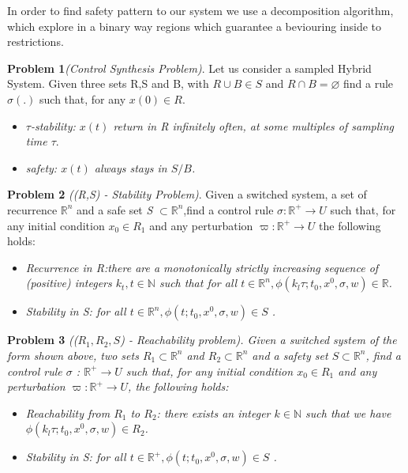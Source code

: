 \documentclass[conference]{IEEEtran}
\begin{document}
In order to find safety pattern to our system we  use a
decomposition algorithm, which explore in a binary way regions which
guarantee a beviouring inside to restrictions. \cite{le2017improved}

  \textbf{Problem 1}\emph{(Control Synthesis Problem)}. Let us 
consider a sampled Hybrid System. Given three sets R,S and B, 
with ${R \cup B \in S}$  and ${R \cap B = \varnothing }$ find a 
rule ${\sigma(.)}$ such that, for any ${x(0) \in R }$. 

\begin{itemize}
    \item \emph{ ${\tau}$-stability: ${x(t)}$ return in R 
    infinitely often, at some multiples of sampling time ${\tau}$}.
    \item \emph{ safety: ${x(t)}$ always stays in ${S/B}$.}
\end{itemize}




 \textbf{Problem 2} \emph{((R,S) - Stability Problem)}. Given a 
 switched system, a set of recurrence 
 ${\mathbb{R}^n}$ and a safe set \emph{S} ${\subset \mathbb{R}^n}$,find a control rule 
 ${\sigma : \mathbb{R}^+ \rightarrow U}$ such that, for any
  initial condition ${x_0  \in  R_1}$ and any perturbation 
  ${\varpi :\mathbb{R}^+\rightarrow U}$  the
   following holds:
 
 \begin{itemize}
    \item \emph{ Recurrence in \emph{R}:there are a monotonically 
    strictly increasing sequence of (positive) integers
    ${k_t, t \in \mathbb{N}}$ such that for all ${ t \in \mathbb{R}^n,
    \phi(k_l\tau;t_0,x^0,\sigma,w) \in \mathbb{R} }$.}

    \item \emph{ Stability in \emph{S}: for all ${ t \in \mathbb{R}^n,
    \phi(t;t_0,x^0,\sigma,w) \in S}$ .}
\end{itemize}


 
\textbf{Problem 3} \emph{((${R_1,R_2,S}$) - Reachability problem).
Given a switched system of the form shown above, two sets  
${ R_1 \subset \mathbb{R}^n}$  and ${ R_2 \subset \mathbb{R}^n}$ 
and a safety set  ${S \subset  \mathbb{R}^n}$, find a control rule 
${\sigma}$ :
${\mathbb{R}^+\rightarrow U}$ such that, for any initial condition 
${x_0  \in  R_1}$ and any perturbation  ${\varpi : \mathbb{R}^+  
\rightarrow U}$, the following holds:}

\begin{itemize}
  \item  \emph{Reachability from ${R_1}$ to ${R_2}$: there exists 
  an integer ${k \in \mathbb{N} }$ such that we have ${ \phi( k_l\tau
  ;t_0,x^0,\sigma,w) \in R_2 }$.}
  
  \item \emph{ Stability in S: for all ${ t \in \mathbb{R}^+, 
  \phi(t;t_0,x^0,\sigma,w) \in S}$ .}
\end{itemize}
\end{document}
